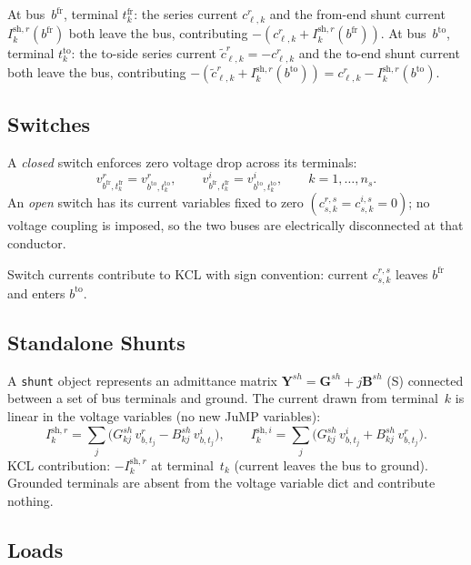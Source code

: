 \documentclass[11pt,a4paper]{article}
\newcommand{\vr}[2]{v^r_{#1,#2}}
\newcommand{\vi}[2]{v^i_{#1,#2}}
\begin{document}
At bus~$b^\text{fr}$, terminal $t^\text{fr}_k$: the series current
$c^r_{\ell,k}$ and the from-end shunt current $I^{\text{sh},r}_k(b^\text{fr})$
both leave the bus, contributing $-(c^r_{\ell,k} + I^{\text{sh},r}_k(b^\text{fr}))$.
At bus~$b^\text{to}$, terminal $t^\text{to}_k$: the to-side series current
$\tilde{c}^r_{\ell,k} = -c^r_{\ell,k}$ and the to-end shunt current both leave
the bus, contributing $-(\tilde{c}^r_{\ell,k} + I^{\text{sh},r}_k(b^\text{to}))
= c^r_{\ell,k} - I^{\text{sh},r}_k(b^\text{to})$.

\subsection{Switches}

A \emph{closed} switch enforces zero voltage drop across its terminals:
%
\begin{equation}
  \vr{b^\text{fr}}{t^\text{fr}_k} = \vr{b^\text{to}}{t^\text{to}_k},\qquad
  \vi{b^\text{fr}}{t^\text{fr}_k} = \vi{b^\text{to}}{t^\text{to}_k},\qquad
  k = 1,\ldots,n_s.
\end{equation}
%
An \emph{open} switch has its current variables fixed to zero
$(c^{r,s}_{s,k} = c^{i,s}_{s,k} = 0)$; no voltage coupling is imposed, so
the two buses are electrically disconnected at that conductor.

Switch currents contribute to KCL with sign convention: current $c^{r,s}_{s,k}$
leaves $b^\text{fr}$ and enters $b^\text{to}$.

\subsection{Standalone Shunts}
\label{sec:shunts}

A \texttt{shunt} object represents an admittance matrix
$\mathbf{Y}^{sh} = \mathbf{G}^{sh} + j\mathbf{B}^{sh}$ (S) connected between
a set of bus terminals and ground.  The current drawn from terminal~$k$ is
linear in the voltage variables (no new JuMP variables):
%
\begin{equation}
  I^{\text{sh},r}_{k}
  = \sum_j \bigl(G^{sh}_{kj}\,v^r_{b,t_j} - B^{sh}_{kj}\,v^i_{b,t_j}\bigr),\qquad
  I^{\text{sh},i}_{k}
  = \sum_j \bigl(G^{sh}_{kj}\,v^i_{b,t_j} + B^{sh}_{kj}\,v^r_{b,t_j}\bigr).
\end{equation}
%
KCL contribution: $-I^{\text{sh},r}_k$ at terminal~$t_k$ (current leaves the
bus to ground).  Grounded terminals are absent from the voltage variable dict
and contribute nothing.

\subsection{Loads}
\label{sec:loads}
\end{document}
